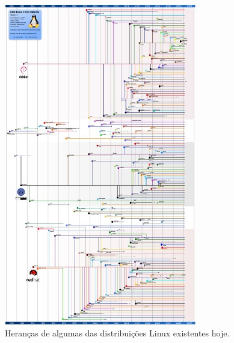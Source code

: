 \begin{anexosenv}
\begin{figure}[h]
  \centering
	\includegraphics[width=0.75\textwidth]{figuras/linux-timeline-heranca}
  \caption{Heranças de algumas das distribuições Linux existentes hoje\protect\footnotemark.}
  \label{fig:figuras_linux_timeline_heranca}
\end{figure}


\end{anexosenv}

